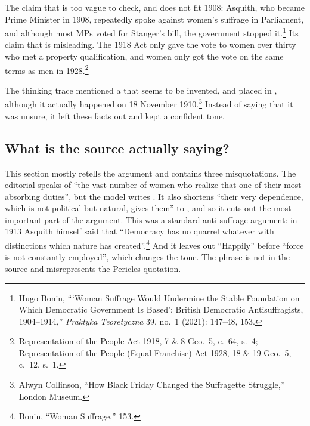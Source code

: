 The claim that  is too vague to check, and does not fit 1908:
Asquith, who became Prime Minister in 1908, repeatedly spoke against women's suffrage in Parliament, and although most MPs voted for Stanger's bill, the government stopped it.\footnote{Hugo Bonin, \enquote{\enquote{Woman Suffrage Would Undermine the Stable Foundation on Which Democratic Government Is Based}: British Democratic Antisuffragists, 1904--1914,} \emph{Praktyka Teoretyczna} 39, no.~1 (2021): 147--48, 153.}
Its claim that  is misleading.
The 1918 Act only gave the vote to women over thirty who met a property qualification, and women only got the vote on the same terms as men in 1928.\footnote{Representation of the People Act 1918, 7 \& 8 Geo.~5, c.~64, s.~4; Representation of the People (Equal Franchise) Act 1928, 18 \& 19 Geo.~5, c.~12, s.~1.}

The thinking trace mentioned a  that seems to be invented,
and placed  in , although it actually happened on 18 November 1910.\footnote{Alwyn Collinson, \enquote{How Black Friday Changed the Suffragette Struggle,} London Museum.}
Instead of saying that it was unsure, it left these facts out and kept a confident tone.

\subsection{What is the source actually saying?}

This section mostly retells the argument and contains three misquotations.
The editorial speaks of \enquote{the vast number of women who realize that one of their most absorbing duties}, but the model writes .
It also shortens \enquote{their very dependence, which is not political but natural, gives them} to , and so it cuts out the most important part of the argument.
This was a standard anti-suffrage argument: in 1913 Asquith himself said that \enquote{Democracy has no quarrel whatever with distinctions which nature has created}.\footnote{Bonin, \enquote{Woman Suffrage,} 153.}
And it leaves out \enquote{Happily} before \enquote{force is not constantly employed}, which changes the tone.
The phrase  is not in the source and misrepresents the Pericles quotation.

